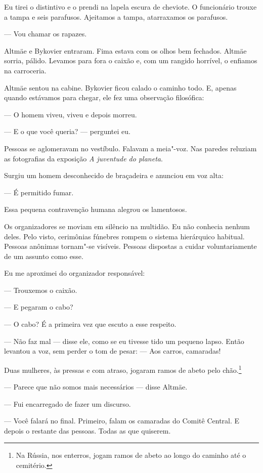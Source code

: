 Eu tirei o distintivo e o prendi na lapela escura de cheviote. O
funcionário trouxe a tampa e seis parafusos. Ajeitamos a tampa,
atarraxamos os parafusos.

--- Vou chamar os rapazes.

Altmäe e Bykovier entraram. Fima estava com os olhos bem fechados.
Altmäe sorria, pálido. Levamos para fora o caixão e, com um rangido
horrível, o enfiamos na carroceria.

Altmäe sentou na cabine. Bykovier ficou calado o caminho todo. E, apenas
quando estávamos para chegar, ele fez uma observação filosófica:

--- O homem viveu, viveu e depois morreu.

--- E o que você queria? --- perguntei eu.

\bigskip

Pessoas se aglomeravam no vestíbulo. Falavam a meia"-voz. Nas paredes
reluziam as fotografias da exposição \emph{A juventude do planeta}.

Surgiu um homem desconhecido de braçadeira e anunciou em voz alta:

--- É permitido fumar.

Essa pequena contravenção humana alegrou os lamentosos.

Os organizadores se moviam em silêncio na multidão. Eu não conhecia
nenhum deles. Pelo visto, cerimônias fúnebres rompem o sistema
hierárquico habitual. Pessoas anônimas tornam"-se visíveis. Pessoas
dispostas a cuidar voluntariamente de um assunto como esse.

Eu me aproximei do organizador responsável:

--- Trouxemos o caixão.

--- E pegaram o cabo?

--- O cabo? É a primeira vez que escuto a esse respeito.

--- Não faz mal --- disse ele, como se eu tivesse tido um pequeno lapso.
Então levantou a voz, sem perder o tom de pesar: --- Aos carros,
camaradas!

Duas mulheres, às pressas e com atraso, jogaram ramos de abeto pelo
chão.\footnote{Na Rússia, nos enterros, jogam ramos de abeto ao longo
  do caminho até o cemitério.}

--- Parece que não somos mais necessários --- disse Altmäe.

--- Fui encarregado de fazer um discurso.

--- Você falará no final. Primeiro, falam os camaradas do Comitê
Central. E depois o restante das pessoas. Todas as que quiserem.

